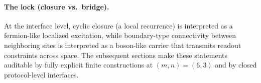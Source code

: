 \paragraph{The lock (closure vs.\ bridge).}
At the interface level, cyclic closure (a local recurrence) is interpreted as a fermion-like localized excitation, while boundary-type connectivity between neighboring sites is interpreted as a boson-like carrier that transmits readout constraints across space.
The subsequent sections make these statements auditable by fully explicit finite constructions at $(m,n)=(6,3)$ and by closed protocol-level interfaces.


